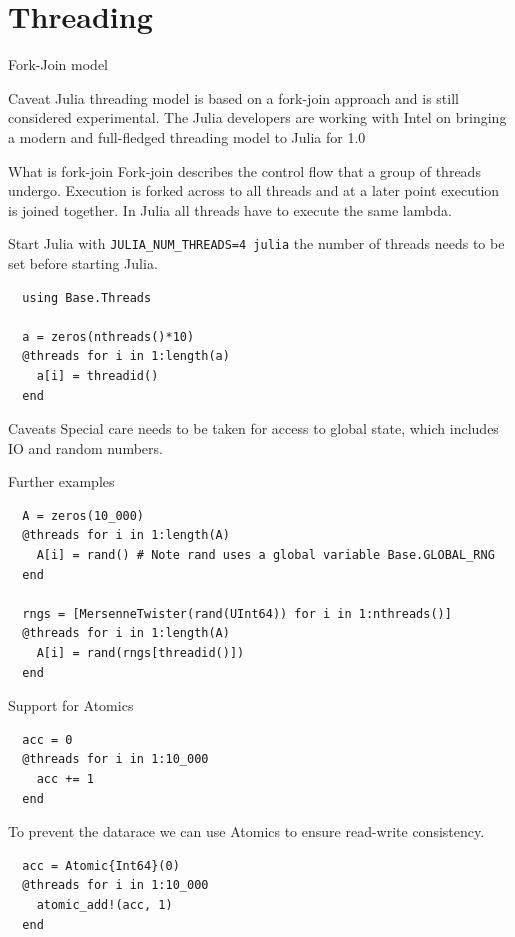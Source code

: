 \documentclass{beamer}
\begin{document}
\section{Threading}
\begin{frame}{Fork-Join model}
  \begin{block}{Caveat}
    Julia threading model is based on a fork-join approach and is still considered experimental.
    The Julia developers are working with Intel on bringing a modern and full-fledged threading model to Julia for 1.0
  \end{block}
  \pause
  \begin{block}{What is fork-join}
    Fork-join describes the control flow that a group of threads undergo. Execution is forked across to all threads and at a later point execution is joined together. In Julia all threads have to execute the same lambda.
  \end{block}
\end{frame}
\begin{frame}[fragile]
  Start Julia with \lstinline{JULIA_NUM_THREADS=4 julia} the number of threads needs to be set before starting Julia.

  \begin{lstlisting}
  using Base.Threads

  a = zeros(nthreads()*10)
  @threads for i in 1:length(a)
    a[i] = threadid()
  end
  \end{lstlisting}
  \begin{block}{Caveats}
    Special care needs to be taken for access to global state, which includes IO and random numbers.
  \end{block}
\end{frame}
\begin{frame}[fragile]{Further examples}
  \begin{lstlisting}
  A = zeros(10_000)
  @threads for i in 1:length(A)
    A[i] = rand() # Note rand uses a global variable Base.GLOBAL_RNG
  end

  rngs = [MersenneTwister(rand(UInt64)) for i in 1:nthreads()]
  @threads for i in 1:length(A)
    A[i] = rand(rngs[threadid()])
  end
  \end{lstlisting}
\end{frame}
\begin{frame}[fragile]{Support for Atomics}
  \begin{lstlisting}
  acc = 0
  @threads for i in 1:10_000
    acc += 1
  end
  \end{lstlisting}
  \begin{block}{}
    To prevent the datarace we can use Atomics to ensure read-write consistency.
  \end{block}
  \begin{lstlisting}
  acc = Atomic{Int64}(0)
  @threads for i in 1:10_000
    atomic_add!(acc, 1)
  end
  \end{lstlisting}
\end{frame}
\end{document}
